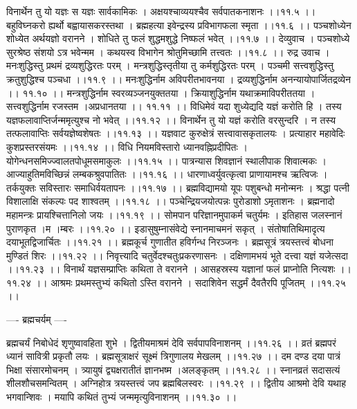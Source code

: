 \documentclass[11pt]{book}
\begin{document}
\begin{landscape}
विनार्थेन तु यो यज्ञः स यज्ञः सार्वकामिकः ।
अक्षयश्चाव्ययश्चैव सर्वपातकनाशनः ।।११.५ ।।
बहुविघ्नकरो ह्यर्थो बह्वायासकरस्तथा ।
ब्रह्महत्या इवेन्द्रस्य प्रविभागफला स्मृता ।।११.६ ।।
पञ्चशोध्येन शोध्येत अर्थयज्ञो वरानने ।
शोधिते तु फलं शुद्धमशुद्धे निष्फलं भवेत् ।।११.७ ।।
देव्युवाच ।
पञ्चशोध्ये सुरश्रेष्ठ संशयो ऽत्र भवेन्मम ।
कथयस्व विभागेन श्रोतुमिच्छामि तत्त्वतः ।।११.८ ।।
रुद्र उवाच ।
मनःशुद्धिस्तु प्रथमं द्रव्यशुद्धिरतः परम् ।
मन्त्रशुद्धिस्तृतीया तु कर्मशुद्धिरतः परम् ।
पञ्चमी सत्त्वशुद्धिस्तु क्रतुशुद्धिश्च पञ्चधा ।।११.९ ।।
मनःशुद्धिर्नाम अविपरीतभावनया । 
द्रव्यशुद्धिर्नाम अनन्यायोपार्जितद्रव्येन ।। ११.१० ।।
मन्त्रशुद्धिर्नाम स्वरव्यञ्जनयुक्ततया । 
क्रियाशुद्धिर्नाम यथाक्रमाविपरीततया । 
सत्त्वशुद्धिर्नाम रजस्तम ।अप्रधानतया ।। ११.११ ।।
विधिमेवं यदा शुध्येद्यदि यज्ञं करोति हि ।
तस्य यज्ञफलावाप्तिर्जन्ममृत्युश्च नो भवेत् ।।११.१२ ।।
विनार्थेन तु यो यज्ञं करोति वरसुन्दरि ।
न तस्य तत्फलावाप्तिः सर्वयज्ञेष्वशेषतः ।।११.१३ ।।
यज्ञवाट कुरुक्षेत्रं सत्त्वावासकृतालयः ।
प्रत्याहार महावेदिः कुशप्रस्तरसंयमः ।।११.१४ ।।
विधि नियमविस्तारो ध्यानवह्निप्रदीपितः ।
योगेन्धनसमिज्ज्वालतपोधूमसमाकुलः ।।११.१५ ।।
पात्रन्यास शिवज्ञानं स्थालीपाक शिवात्मकः ।
आज्याहुतिमविच्छिन्नं लम्बकश्रुवपातितः ।।११.१६ ।।
धारणाध्वर्युवत्कृत्वा प्राणायामश्च ऋत्विजः ।
तर्कयुक्तः सविस्तारः समाधिर्वयतापनः ।।११.१७ ।।
ब्रह्मविद्यामयो यूपः पशुबन्धो मनोन्मनः ।
श्रद्धा पत्नी विशालाक्षि संकल्पः पद शाश्वतम् ।।११.१८ ।।
पञ्चेन्द्रियजयोत्पन्नः पुरोडाशो ऽमृताशनः ।
ब्रह्मनादो महामन्त्रः प्रायश्चित्तानिलो जयः ।।११.१९ ।।
सोमपान परिज्ञानमुपाकर्म चतुर्यमः ।
इतिहास जलस्नानं पुराणकृत{ ।}म{ ।}म्बरः ।।११.२० ।।
इडासुषुम्नासंवेद्ये स्नानमाचमनं सकृत् ।
संतोषातिथिमादृत्य दयाभूतद्विजार्चितः ।।११.२१ ।।
ब्रह्मकूर्च गुणातीत हविर्गन्ध निरञ्जनः ।
ब्रह्मसूत्रं त्रयस्तत्त्वं बोधना मुण्डितं शिरः ।।११.२२ ।।
निवृत्त्यादि चतुर्वेदश्चतुःप्रकरणासनः ।
दक्षिणामभयं भूते दत्त्वा यज्ञं यजेत्सदा ।।११.२३ ।।
विनार्थं यज्ञसम्प्राप्तिः कथिता ते वरानने ।
आसहस्रस्य यज्ञानां फलं प्राप्नोति नित्यशः ।।११.२४ ।।
आश्रमः प्रथमस्तुभ्यं कथितो ऽस्ति वरानने ।
सदाशिवेन सद्धर्मं दैवतैरपि पूजितम् ।।११.२५ ।।

---- ब्रह्मचर्यम् ----

ब्रह्मचर्यं निबोधेदं शृणुष्वावहिता शुभे ।
द्वितीयमाश्रमं देवि सर्वपापविनाशनम् ।।११.२६ ।।
व्रतं ब्रह्मपरं ध्यानं सावित्री प्रकृतौ लयः ।
ब्रह्मसूत्राक्षरं सूक्ष्मं त्रिगुणालय मेखलम् ।।११.२७ ।।
दम दण्ड दया पात्रं भिक्षा संसारमोचनम् ।
त्र्यायुषं द्व्यक्षरातीतं ज्ञानभष्म ।अलङ्कृतम् ।।११.२८ ।।
स्नानव्रतं सदासत्यं शीलशौचसमन्वितम् ।
अग्निहोत्र त्रयस्तत्त्वं जप ब्रह्मबिलस्वरः ।।११.२९ ।।
द्वितीय आश्रमो देवि यथाह भगवान्शिवः ।
मयापि कथितं तुभ्यं जन्ममृत्युविनाशनम् ।।११.३० ।।


\end{landscape}
\end{document}
